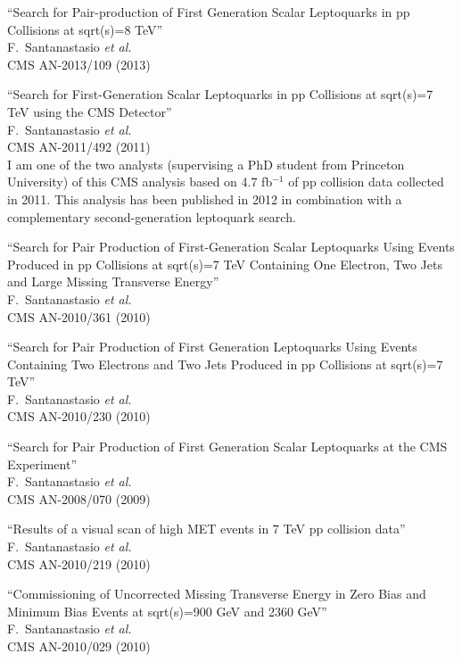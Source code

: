 \documentclass[10pt, a4paper]{article}
\begin{document}
\begin{thebibliography}{599}
``Search for Pair-production of First Generation Scalar Leptoquarks in pp Collisions at sqrt(s)=8 TeV''
  \\{}F.~Santanastasio {\it et al.}
  \\{}CMS AN-2013/109 (2013)

``Search for First-Generation Scalar Leptoquarks in pp Collisions at sqrt(s)=7 TeV using the CMS Detector''
  \\{}F.~Santanastasio {\it et al.}
  \\{}CMS AN-2011/492 (2011)
  \\ I am one of the two analysts (supervising a PhD student from Princeton University) of this CMS analysis based on 4.7 fb$^{-1}$ of pp collision data collected in 2011. 
This analysis has been published in 2012 in combination with a complementary second-generation leptoquark search.

``Search for Pair Production of First-Generation Scalar Leptoquarks Using Events Produced in pp Collisions at sqrt(s)=7 TeV Containing One Electron, Two Jets and Large Missing Transverse Energy''
  \\{}F.~Santanastasio {\it et al.}
  \\{}CMS AN-2010/361 (2010)

``Search for Pair Production of First Generation Leptoquarks Using Events Containing Two Electrons and Two Jets Produced in pp Collisions at sqrt(s)=7 TeV''
  \\{}F.~Santanastasio {\it et al.}
  \\{}CMS AN-2010/230 (2010)

``Search for Pair Production of First Generation Scalar Leptoquarks at the CMS Experiment''
  \\{}F.~Santanastasio {\it et al.}
  \\{}CMS AN-2008/070 (2009)

``Results of a visual scan of high MET events in 7 TeV pp collision data''
  \\{}F.~Santanastasio {\it et al.}
  \\{}CMS AN-2010/219 (2010)
  
``Commissioning of Uncorrected Missing Transverse Energy in Zero Bias and Minimum Bias Events at  sqrt(s)=900 GeV and  2360 GeV''
  \\{}F.~Santanastasio {\it et al.}
  \\{}CMS AN-2010/029 (2010)


\end{thebibliography}
\end{document}
